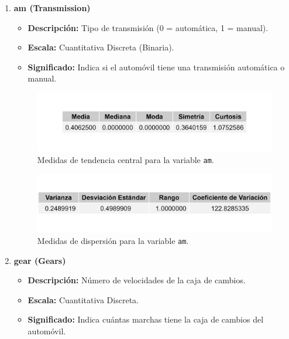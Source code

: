 \documentclass{article}
\begin{document}
\begin{enumerate}
    \item \textbf{am (Transmission)}

          \begin{itemize}
              \item \textbf{Descripción:} Tipo de transmisión (0 = automática, 1 = manual).
              \item \textbf{Escala:} Cuantitativa Discreta (Binaria).
              \item \textbf{Significado:} Indica si el automóvil tiene una transmisión automática o manual.
          \end{itemize}
          
          \begin{figure}[H]
              \centering
              \includegraphics[width=\textwidth]{MTC/am_central.png}
              \caption{Medidas de tendencia central para la variable \texttt{am}.}
              \label{fig:am_central}
          \end{figure}
          
          \begin{figure}[H]
              \centering
              \includegraphics[width=\textwidth]{MTC/am_dispersion.png}
              \caption{Medidas de dispersión para la variable \texttt{am}.}
              \label{fig:am_dispersion}
          \end{figure}

    \item \textbf{gear (Gears)}

          \begin{itemize}
              \item \textbf{Descripción:} Número de velocidades de la caja de cambios.
              \item \textbf{Escala:} Cuantitativa Discreta.
              \item \textbf{Significado:} Indica cuántas marchas tiene la caja de cambios del automóvil.
          \end{itemize}
          

\end{enumerate}
\end{document}
